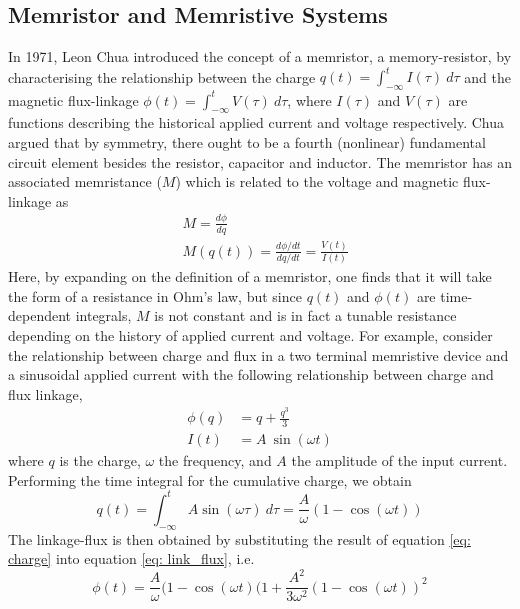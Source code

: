 \subsection{Memristor and Memristive Systems}
In 1971, Leon Chua introduced the concept of a memristor, a memory-resistor, by characterising the relationship between the charge $q(t) = \int_{-\infty}^{t} I(\tau) ~d\tau$ and the magnetic flux-linkage $\phi(t) = \int_{-\infty}^{t} V(\tau) ~d\tau$, where $I(\tau)$ and $V(\tau)$ are functions describing the historical applied current and voltage respectively\cite{chua1971}. Chua argued that by symmetry, there ought to be a fourth (nonlinear) fundamental circuit element besides the resistor, capacitor and inductor. The memristor has an associated memristance ($M$) which is related to the voltage and magnetic flux-linkage as
\begin{align}
& M = \frac{d\phi}{dq} \label{eq: mem_phi}\\
& M(q(t)) = \frac{d\phi/dt}{dq/dt} = \frac{V(t)}{I(t)} \label{eq: memristance_ohm}
\end{align}
Here, by expanding on the definition of a memristor, one finds that it will take the form of a resistance in Ohm's law, but since $q(t)$ and $\phi(t)$ are time-dependent integrals, $M$ is not constant and is in fact a tunable resistance depending on the history of applied current and voltage. For example\cite{chua2011}, consider the relationship between charge and flux in a two terminal memristive device and a sinusoidal applied current with the following relationship between charge and flux linkage,
\begin{align}
\phi(q) &= q + \frac{q^3}{3} \label{eq: link_flux} \\
I(t) &= A ~ \sin(\omega t) \label{eq: current_profile}
\end{align}
where $q$ is the charge, $\omega$ the frequency, and $A$ the amplitude of the input current.
Performing the time integral for the cumulative charge, we obtain
\begin{equation}
q(t) = \int_{-\infty}^{t} A \sin(\omega \tau) ~d\tau = \frac{A}{\omega} ( 1 - \cos(\omega t))
\label{eq: charge}
\end{equation}
The linkage-flux is then obtained by substituting the result of equation \ref{eq: charge} into equation \ref{eq: link_flux}, i.e.
\begin{equation}
\phi(t) = \frac{A}{\omega}(1-\cos(\omega t) ( 1 + \frac{A^2}{3 \omega^2} (1 - \cos(\omega t))^2 
\end{equation}

